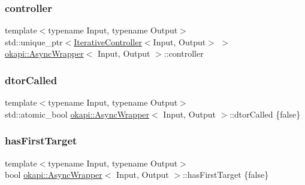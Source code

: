 \subsubsection{\texorpdfstring{controller}{controller}}
{\footnotesize\ttfamily template$<$typename Input, typename Output$>$ \\
std\+::unique\+\_\+ptr$<$\mbox{\hyperlink{classokapi_1_1IterativeController}{Iterative\+Controller}}$<$Input, Output$>$ $>$ \mbox{\hyperlink{classokapi_1_1AsyncWrapper}{okapi\+::\+Async\+Wrapper}}$<$ Input, Output $>$\+::controller\hspace{0.3cm}{\ttfamily [protected]}}

\mbox{\label{classokapi_1_1AsyncWrapper_aae007010b0b30b530f0b468ebe1d2aef}} 
\subsubsection{\texorpdfstring{dtorCalled}{dtorCalled}}
{\footnotesize\ttfamily template$<$typename Input, typename Output$>$ \\
std\+::atomic\+\_\+bool \mbox{\hyperlink{classokapi_1_1AsyncWrapper}{okapi\+::\+Async\+Wrapper}}$<$ Input, Output $>$\+::dtor\+Called \{false\}\hspace{0.3cm}{\ttfamily [protected]}}

\mbox{\label{classokapi_1_1AsyncWrapper_a75812fac3f252bf5e8d3d4e466d085b8}} 
\subsubsection{\texorpdfstring{hasFirstTarget}{hasFirstTarget}}
{\footnotesize\ttfamily template$<$typename Input, typename Output$>$ \\
bool \mbox{\hyperlink{classokapi_1_1AsyncWrapper}{okapi\+::\+Async\+Wrapper}}$<$ Input, Output $>$\+::has\+First\+Target \{false\}\hspace{0.3cm}{\ttfamily [protected]}}

